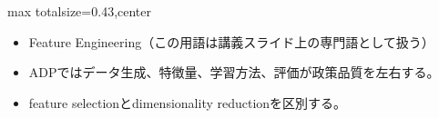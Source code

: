 \clearpage
{}
\begin{minipage}[t]{0.405\textwidth}
\begin{adjustbox}{max totalsize={\textwidth}{0.43\textheight},center}
\begin{minipage}{\textwidth}\scriptsize
{}\begin{itemize}
\item Feature Engineering（この用語は講義スライド上の専門語として扱う）
\end{itemize}\begin{itemize}
\item ADPではデータ生成、特徴量、学習方法、評価が政策品質を左右する。
\item feature selectionとdimensionality reductionを区別する。
\end{itemize}
\end{minipage}
\end{adjustbox}
\end{minipage}\hfill
